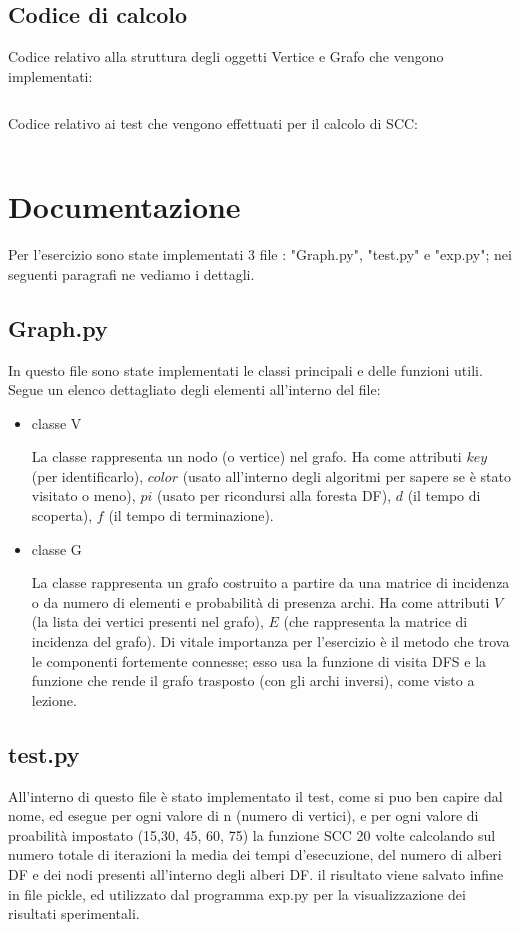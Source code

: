 \documentclass{article}
\begin{document}
\subsection{Codice di calcolo}
Codice relativo alla struttura degli oggetti Vertice e Grafo che vengono implementati:
\inputminted{python}{python1.py}
\newpage
Codice relativo ai test che vengono effettuati per il calcolo di SCC:
\inputminted{python}{python2.py}

\newpage
\section{Documentazione}
Per l'esercizio sono state implementati 3 file : "Graph.py", "test.py" e "exp.py"; nei seguenti paragrafi ne vediamo i dettagli.

\subsection{Graph.py}
In questo file sono state implementati le classi principali e delle funzioni utili. Segue un elenco dettagliato degli elementi all'interno del file:
\begin{itemize}
\item classe V

La classe rappresenta un nodo (o vertice) nel grafo. Ha come attributi $key$ (per identificarlo), $color$ (usato all'interno degli algoritmi per sapere se è stato visitato o meno), $pi$ (usato per ricondursi alla foresta DF), $d$ (il tempo di scoperta), $f$ (il tempo di terminazione).
\item classe G

La classe rappresenta un grafo costruito a partire da una matrice di incidenza o da numero di elementi e probabilità di presenza archi. Ha come attributi $V$ (la lista dei vertici presenti nel grafo), $E$ (che rappresenta la matrice di incidenza del grafo). Di vitale importanza per l'esercizio è il metodo che trova le componenti fortemente connesse; esso usa la funzione di visita DFS e la funzione che rende il grafo trasposto (con gli archi inversi), come visto a lezione.

\end{itemize}

\subsection{test.py}
All'interno di questo file è stato implementato il test, come si puo ben capire dal nome, ed esegue per ogni valore di n (numero di vertici), e per ogni valore di proabilità impostato (15,30, 45, 60, 75) la funzione SCC 20 volte calcolando sul numero totale di iterazioni la media dei tempi d'esecuzione, del numero di alberi DF e dei nodi presenti all'interno degli alberi DF.
il risultato viene salvato infine in file pickle, ed utilizzato dal programma exp.py per la visualizzazione dei risultati sperimentali.
\end{document}
